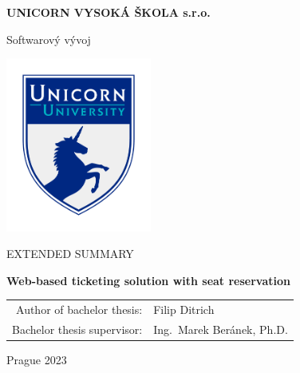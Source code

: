\pagestyle{empty}
\begin{center}

{\bfseries\large UNICORN VYSOKÁ ŠKOLA s.r.o.}

    \vspace{3mm}

    {\Large Softwarový vývoj}

    \vfill
    \vspace{3mm}

    \centerline{\mbox{\includegraphics[width=48mm]{../figures/uu-icon}}}

    \vfill
    \vspace{3mm}

    {\normalsize\MakeUppercase{Extended Summary}}

    \vspace{6mm}

    {\LARGE\bfseries Web-based ticketing solution with seat reservation}

    \vfill

    \begin{tabular}{rl}
        Author of bachelor thesis: & Filip Ditrich\\
        \noalign{\vspace{2mm}}
        Bachelor thesis supervisor: & Ing.\ Marek Beránek, Ph.D.\\
    \end{tabular}

    \vfill

    Prague 2023

\end{center}
